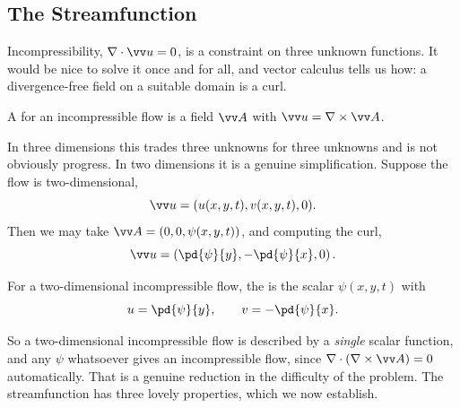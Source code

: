 \subsection{The Streamfunction}

Incompressibility, $\nabla \cdot \vv u = 0$, is a constraint on three unknown functions. It would be nice to solve it once and for all, and vector calculus tells us how: a divergence-free field on a suitable domain is a curl.

\begin{definition}
	A  for an incompressible flow is a field $\vv A$ with $\vv u = \nabla \times \vv A$.
\end{definition}

In three dimensions this trades three unknowns for three unknowns and is not obviously progress. In two dimensions it is a genuine simplification. Suppose the flow is two-dimensional,
$$
\vv u = (u(x, y, t), v(x, y, t), 0).
$$
Then we may take $\vv A = (0, 0, \psi(x, y, t))$, and computing the curl,
$$
\vv u = \left( \pd{\psi}{y}, -\pd{\psi}{x}, 0\right).
$$

\begin{definition}[Streamfunction]
	For a two-dimensional incompressible flow, the  is the scalar $\psi(x, y, t)$ with
	$$
	u = \pd{\psi}{y}, \qquad v = -\pd{\psi}{x}.
	$$
\end{definition}

So a two-dimensional incompressible flow is described by a \emph{single} scalar function, and any $\psi$ whatsoever gives an incompressible flow, since $\nabla \cdot (\nabla \times \vv A) = 0$ automatically. That is a genuine reduction in the difficulty of the problem. The streamfunction has three lovely properties, which we now establish.

